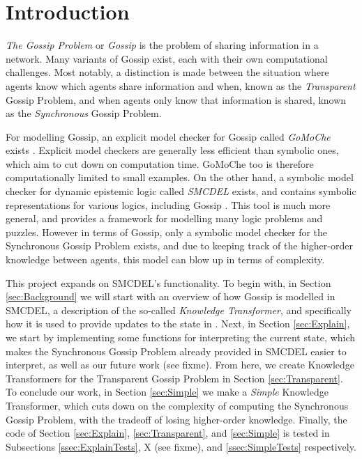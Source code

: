 \section{Introduction}

\textit{The Gossip Problem} or \textit{Gossip} is the problem of sharing information in a network. Many variants of Gossip exist, each with their own computational challenges. Most notably, a distinction is made between the situation where agents know which agents share information and when, known as the \textit{Transparent} Gossip Problem, and when agents only know that information is shared, known as the \textit{Synchronous} Gossip Problem.

For modelling Gossip, an explicit model checker for Gossip called \textit{GoMoChe} exists \cite{gattinger2023gomoche}. Explicit model checkers are generally less efficient than symbolic ones, which aim to cut down on computation time. GoMoChe too is therefore computationally limited to small examples. On the other hand, a symbolic model checker for dynamic epistemic logic called \textit{SMCDEL} exists, and contains symbolic representations for various logics, including Gossip \cite{GattingerThesis2018}. This tool is much more general, and provides a framework for modelling many logic problems and puzzles. However in terms of Gossip, only a symbolic model checker for the Synchronous Gossip Problem exists, and due to keeping track of the higher-order knowledge between agents, this model can blow up in terms of complexity.

This project expands on SMCDEL's functionality. To begin with, in Section \ref{sec:Background} we will start with an overview of how Gossip is modelled in SMCDEL, a description of the so-called \textit{Knowledge Transformer}, and specifically how it is used to provide updates to the state in \cite{GattingerThesis2018}. Next, in Section \ref{sec:Explain}, we start by implementing some functions for interpreting the current state, which makes the Synchronous Gossip Problem already provided in SMCDEL easier to interpret, as well as our future work (see fixme). From here, we create Knowledge Transformers for the Transparent Gossip Problem in Section \ref{sec:Transparent}. To conclude our work, in Section \ref{sec:Simple} we make a \textit{Simple} Knowledge Transformer, which cuts down on the complexity of computing the Synchronous Gossip Problem, with the tradeoff of losing higher-order knowledge. Finally, the code of Section \ref{sec:Explain}, \ref{sec:Transparent}, and \ref{sec:Simple} is tested in Subsections \ref{ssec:ExplainTests}, X (see fixme), and \ref{ssec:SimpleTests} respectively.

